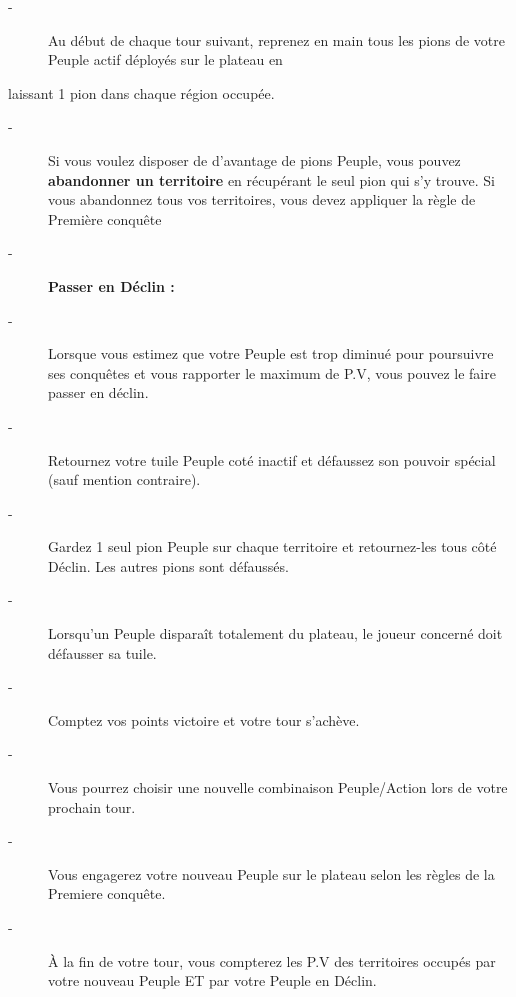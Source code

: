 \documentclass{scrartcl}%
\begin{document}
%
\begin{description}%
\item[{-} ]%
%
 Au début de chaque tour suivant, reprenez en main tous les pions de votre Peuple actif déployés sur le plateau en
%
\end{description}%
laissant 1 pion dans chaque région occupée.
%
\begin{description}%
\item[{-} ]%
%
 Si vous voulez disposer de d'avantage de pions Peuple, vous pouvez %
\textcolor{mygreen}{%
\textbf{abandonner un territoire}%
}%
\textit{ }%
 en récupérant le seul pion qui s'y trouve. Si vous abandonnez tous vos territoires, vous devez appliquer la règle de Première conquête
%
\item[{-} ]%
%
\textcolor{mygreen}{%
\textbf{Passer en Déclin :}%
}%

%
\item[{-} ]%
%
 Lorsque vous estimez que votre Peuple est trop diminué pour poursuivre ses conquêtes et vous rapporter le maximum de P.V, vous pouvez le faire passer en déclin.
%
\item[{-} ]%
%
 Retournez votre tuile Peuple coté inactif et défaussez son pouvoir spécial (sauf mention contraire).
%
\item[{-} ]%
%
 Gardez 1 seul pion Peuple sur chaque territoire et retournez{-}les tous côté Déclin. Les autres pions sont défaussés.
%
\item[{-} ]%
%
 Lorsqu'un Peuple disparaît totalement du plateau, le joueur concerné doit défausser sa tuile.
%
\item[{-} ]%
%
 Comptez vos points victoire et votre tour s’achève.
%
\item[{-} ]%
%
 Vous pourrez choisir une nouvelle combinaison Peuple/Action lors de votre prochain tour.
%
\item[{-} ]%
%
 Vous engagerez votre nouveau Peuple sur le plateau selon les règles de la Premiere conquête.
%
\item[{-} ]%
%
 À la fin de votre tour, vous compterez les P.V des territoires occupés par votre nouveau Peuple ET par votre Peuple en Déclin.
%
\end{description}

%
\end{document}
